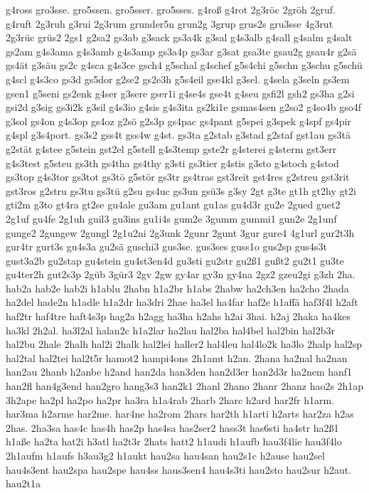 {g4ross
gro3sse.
gro5ssen.
gro5sser.
gro5sses.
g4roß
g4rot
2g3röc
2gröh
2gruf.
g4ruft
2g3ruh
g3rui
2g3rum
grunder5n
grun2g
3grup
grus2s
gru3sse
4g3rut
2g3rüc
grüs2
2gs1
g2sa2
gs3ab
g3sack
gs3a4k
g3sal
g4s3alb
g4sall
g4salm
g4salt
gs2am
g4s3ama
g4s3amb
g4s3amp
gs3a4p
gs3ar
g3sat
gsa3te
gsau2g
gsau4r
g2sä
gs4ät
g3säu
gs2c
g4sca
g4s3ce
gsch4
g5schal
g4schef
g5s4chi
g5schn
g3schu
g5schü
g4scl
g4s3co
gs3d
gs5dor
g2se2
gs2e3h
g5s4eil
gse4kl
g3sel.
g4sela
g3seln
gs3em
gsen1
g5seni
gs2enk
g4ser
g3sere
gser1i
g4se4s
gse4t
g4seu
gsfi2l
gsh2
gs3ha
g2si
gsi2d
g3sig
gs3i2k
g3sil
g4s3io
g4sis
g4s3ita
gs2ki1e
gsmas4sen
g2so2
g4so4b
gso4f
g3sol
gs4on
g4s3op
gs4oz
g2sö
g2s3p
gs4pac
gs4pant
g5spei
g3spek
g4spf
gs4pir
g4spl
g3s4port.
gs3s2
gss4t
gss4w
g4st.
gs3ta
g2stab
g3stad
g2staf
gst1au
gs3tä
g2stät
g4stee
g5stein
gst2el
g5stell
g4s3temp
gste2r
g4sterei
g4sterm
gst3err
g4s3test
g5steu
gs3th
gs4tha
gs4thy
g3sti
gs3tier
g4stis
g3sto
g4stoch
g4stod
gs3top
g4s3tor
gs3tot
gs3tö
g5stör
gs3tr
gs4tras
gst3reit
gst4res
g2streu
gst3rit
gst3ros
g2stru
gs3tu
gs3tü
g2su
gs4uc
gs3un
gsü3s
g3sy
2gt
g3te
gt1h
gt2hy
gt2i
gti2m
g3to
gt4ra
gt2se
gu4ale
gu3am
gu1ant
gu1as
gu4d3r
gu2e
2gued
guet2
2g1uf
gu4fe
2g1uh
guil3
gu3ins
gu1i4s
gum2e
3gumm
gummi1
gun2e
2g1unf
gunge2
2gungew
2gungl
2g1u2ni
2g3unk
2gunr
2gunt
3gur
gure4
4g1url
gur2t3h
gur4tr
gurt3s
gu4s3a
gu2sä
guschi3
gus3se.
gus3ses
guss1o
gus2sp
gus4s3t
gust3a2b
gu2stap
gu4stein
gu4st3en4d
gu3sti
gu2str
gu2ß1
gußt2
gu2t1
gu3te
gu4ter2h
gut2s3p
2güb
3gür3
2gv
2gw
gy4ar
gy3n
gy4na
2gz2
gzeu2gi
g3zh
2ha.
hab2a
hab2e
hab2i
h1ablu
2habn
h1a2br
h1abs
2habw
ha2ch3en
ha2cho
2hada
ha2del
hade2n
h1adle
h1a2dr
ha3dri
2hae
ha3el
ha4far
haf2e
h1affä
haf3f4l
h2aft
haf2tr
haf4tre
haft4s3p
hag2a
h2agg
ha3ha
h2ahs
h2ai
3hai.
h2aj
2haka
ha4kes
ha3kl
2h2al.
ha3l2al
halan2c
h1a2lar
ha2lau
hal2ba
hal4bel
hal2bin
hal2b3r
hal2bu
2hale
2halh
hal2i
2halk
hal2lei
haller2
hal4leu
hal4lo2k
ha3lo
2halp
hal2sp
hal2tal
hal2tei
hal2t5r
hamot2
hampi4ons
2h1amt
h2an.
2hana
ha2nal
ha2nan
han2au
2hanb
h2anbe
h2and
han2da
han3den
han2d3er
han2d3r
ha2nem
hanf1
han2fl
han4g3end
han2gro
hang3s3
han2k1
2hanl
2hano
2hanr
2hanz
hao2s
2h1ap
3h2ape
ha2pl
ha2po
ha2pr
ha3ra
h1a4rab
2harb
2harc
h2ard
har2fr
h1arm.
har3ma
h2arme
har2me.
har4ne
ha2rom
2hars
har2th
h1arti
h2arts
har2za
h2as
2has.
2ha3sa
has4c
has4h
has2p
has4sa
has2ser2
hass3t
has6sti
ha4str
ha2ß1
h1aße
ha2ta
hat2i
h3atl
ha2t3r
2hats
hatt2
h1audi
h1aufb
hau3f4lie
hau3f4lo
2h1aufm
h1aufs
h3au3g2
h1aukt
hau2sa
hau4san
hau2s1c
h2ause
hau2sel
hau4s3ent
hau2spa
hau2spe
hau4ss
haus3sen4
hau4s3ti
hau2sto
hau2sur
h2aut.
hau2t1a
}
